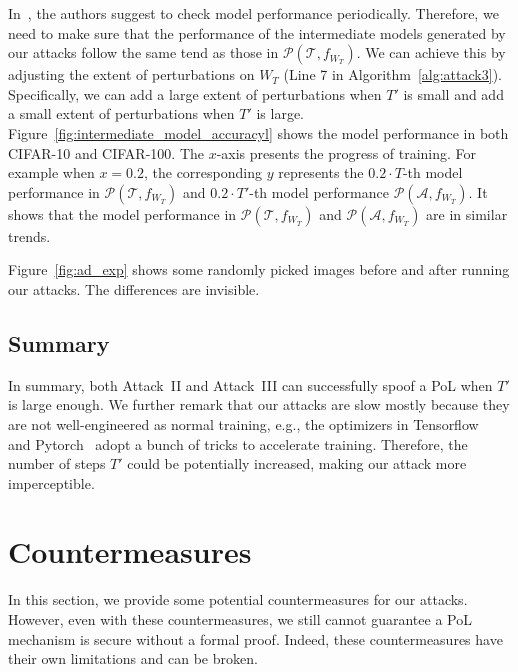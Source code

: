 \documentclass[conference]{IEEEtran}
\newcommand{\Prov}{\mathcal{T}\xspace}
\newcommand{\Adv}{\mathcal{A}\xspace}
\newcommand{\Proof}{\mathcal{P}\xspace}
\newcommand{\fig}{\textrm{Figure}\xspace}
\begin{document}
In~\cite{PoL}, the authors {suggest\EndAccSupp{}} to check model performance periodically.
Therefore, we need to make sure that the performance of the intermediate models generated by our attacks follow the same tend as those in  $\Proof(\Prov, f_{W_T})$.
We can achieve this by adjusting the extent of {perturbations\EndAccSupp{}} on $W_T$ (Line 7 in Algorithm~\ref{alg:attack3}).
Specifically, we can add a large extent of {perturbations\EndAccSupp{}} when $T'$ is small and add a small extent of perturbations when $T'$ is large.
\fig~\ref{fig:intermediate_model_accuracyl} shows the model performance in both CIFAR-10 and CIFAR-100.
The $x$-axis presents the progress of training. 
For example when $x=0.2$, the corresponding $y$ represents the $0.2\cdot T$-th model performance in $\Proof(\Prov, f_{W_T})$ and $0.2\cdot T'$-th model performance $\Proof(\Adv, f_{W_T})$.
It shows that the model performance in $\Proof(\Prov, f_{W_T})$ and $\Proof(\Adv, f_{W_T})$ are in similar trends.


\fig~\ref{fig:ad_exp} shows some randomly picked {images\EndAccSupp{}} before and after running our attacks.
The differences are invisible.

\subsection{Summary}

In summary, both Attack~II and Attack~III can successfully {spoof\EndAccSupp{}} a PoL when $T'$ is large enough.
We further remark that our attacks are slow mostly because they are not well-engineered as normal training, e.g., the optimizers in Tensorflow~\cite{Abadi2016tensorflow} and Pytorch~\cite{Paszke2019PyTorch} adopt a bunch of tricks to accelerate training.
Therefore, the number of steps $T'$ could be potentially increased, making our attack more imperceptible.

%
 
\section{Countermeasures}
\label{sec:discuss}

In this section, we provide some potential {countermeasures\EndAccSupp{}} for our attacks.
However, even with these countermeasures, we still cannot guarantee a PoL mechanism is {secure\EndAccSupp{}} without a formal proof.
Indeed, these {countermeasures\EndAccSupp{}} have their own {limitations\EndAccSupp{}} and can be broken.
\end{document}

